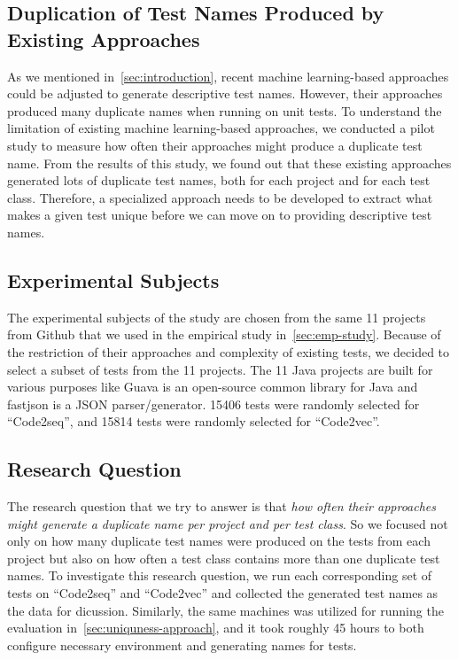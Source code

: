 \newpage
\begin{appendices}
\section{Duplication of Test Names Produced by Existing Approaches}

As we mentioned in~\cref{sec:introduction}, recent machine learning-based approaches could be adjusted to generate descriptive test names.
%
However, their approaches produced many duplicate names when running on unit tests.
%
To understand the limitation of existing machine learning-based approaches, we conducted a pilot study to measure how often their approaches might produce a duplicate test name.
%
From the results of this study, we found out that these existing approaches generated lots of duplicate test names, both for each project and for each test class.
%
Therefore, a specialized approach needs to be developed to extract what makes a given test unique before we can move on to providing descriptive test names.


\subsection{Experimental Subjects}

The experimental subjects of the study are chosen from the same \num{11} projects from Github that we used in the empirical study in~\cref{sec:emp-study}.
%
Because of the restriction of their approaches and complexity of existing tests, we decided to select a subset of tests from the \num{11} projects.
%
The \num{11} Java projects are built for various purposes like Guava is an open-source common library for Java and fastjson is a JSON parser\slash generator.
%
\num{15406} tests were randomly selected for \enquote{Code2seq}, and \num{15814} tests were randomly selected for \enquote{Code2vec}.


\subsection{Research Question}

The research question that we try to answer is that \emph{how often their approaches might generate a duplicate name per project and per test class}.
%
So we focused not only on how many duplicate test names were produced on the tests from each project but also on how often a test class contains more than one duplicate test names.
%
To investigate this research question, we run each corresponding set of tests on \enquote{Code2seq} and \enquote{Code2vec} and collected the generated test names as the data for dicussion.
%
Similarly, the same machines was utilized for running the evaluation in~\cref{sec:uniquness-approach}, and it took roughly \num{45} hours to both configure necessary environment and generating names for tests.



\end{appendices}
